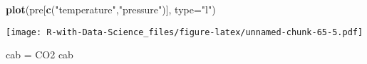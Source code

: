\documentclass[
]{article}
\newenvironment{Shaded}{\begin{snugshade}}{\end{snugshade}}
\newcommand{\AttributeTok}[1]{\textcolor[rgb]{0.13,0.29,0.53}{#1}}
\newcommand{\FunctionTok}[1]{\textcolor[rgb]{0.13,0.29,0.53}{\textbf{#1}}}
\newcommand{\NormalTok}[1]{#1}
\newcommand{\OtherTok}[1]{\textcolor[rgb]{0.56,0.35,0.01}{#1}}
\newcommand{\StringTok}[1]{\textcolor[rgb]{0.31,0.60,0.02}{#1}}
\begin{document}
\begin{Shaded}
\begin{Highlighting}[]
\FunctionTok{plot}\NormalTok{(pre[}\FunctionTok{c}\NormalTok{(}\StringTok{"temperature"}\NormalTok{,}\StringTok{"pressure"}\NormalTok{)], }\AttributeTok{type=}\StringTok{"l"}\NormalTok{)}
\end{Highlighting}
\end{Shaded}

\texttt{[image: R-with-Data-Science\_files/figure-latex/unnamed-chunk-65-5.pdf]}

\begin{Shaded}
\begin{Highlighting}[]
\NormalTok{cab }\OtherTok{=}\NormalTok{ CO2}
\NormalTok{cab}
\end{Highlighting}
\end{Shaded}
\end{document}
